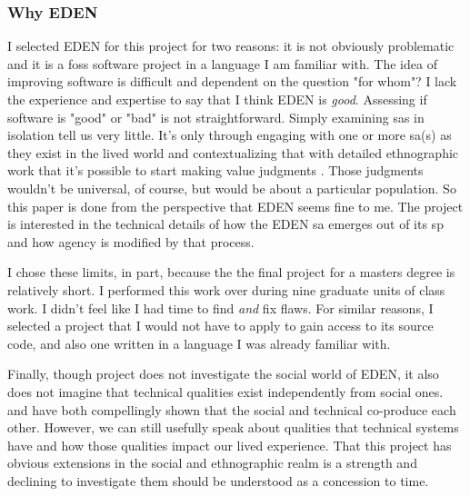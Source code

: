\documentclass[a4paper,man,natbib,floatsintext]{apa6}
\begin{document}
   \subsubsection{Why EDEN}
   I selected \gls{EDEN} for this project for two reasons: it is not obviously problematic and it is a \acrfull{foss} software project in a language I am familiar with. The idea of improving software is difficult and dependent on the question "for whom"? I lack the experience and expertise to say that I think \gls{EDEN} is \textit{good}. Assessing if software is "good" or "bad" is not straightforward. Simply examining \glspl{sa} in isolation tell us very little. It's only through engaging with one or more \gls{sa}(s) as they exist in the lived world and contextualizing that with detailed ethnographic work that it's possible to start making value judgments \citep{Eubanks2018-hc,Schull2012-nc}. Those judgments wouldn't be universal, of course, but would be about a particular population. So this paper is done from the perspective that \gls{EDEN} seems fine to me. The project is interested in the technical details of how the \gls{EDEN} \gls{sa} emerges out of its \gls{sp} and how agency is modified by that process. 

   I chose these limits, in part, because the the final project for a masters degree is relatively short. I performed this work over during nine graduate units of class work. I didn't feel like I had time to find \textit{and} fix flaws. For similar reasons, I selected a project that I would not have to apply to gain access to its source code, and also one written in a language I was already familiar with\footnotemark.


   Finally, though project does not investigate the social world of \gls{EDEN}, it also does not imagine that technical qualities exist independently from social ones. \citet{Gabriella_Coleman2012-lq} and \citet{Kelty2008-jm} have both compellingly shown that the social and technical co-produce each other. However, we can still usefully speak about qualities that technical systems have and how those qualities impact our lived experience. That this project has obvious extensions in the social and ethnographic realm is a strength and declining to investigate them should be understood as a concession to time.
\end{document}
